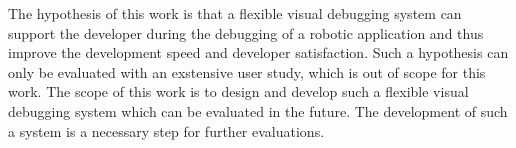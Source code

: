 The hypothesis of this work is that a flexible visual debugging system can support the developer during the debugging of a robotic application and thus improve the development speed and developer satisfaction. Such a hypothesis can only be evaluated with an exstensive user study, which is out of scope for this work. The scope of this work is to design and develop such a flexible visual debugging system which can be evaluated in the future. The development of such a system is a necessary step for further evaluations.



